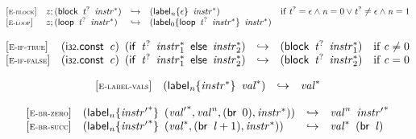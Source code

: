 \vspace{1ex}

$$
\begin{array}{@{}l@{}lcl@{}l@{}}
{[\textsc{\scriptsize E{-}block}]} \quad & {\mathit{z}} ; (\mathsf{block}~\,{{\mathit{t}}^?}~\,{{\mathit{instr}}^\ast}) &\hookrightarrow& ({{\mathsf{label}}_{{\mathit{n}}}}{\{\epsilon\}}~\,{{\mathit{instr}}^\ast}) &\quad
  \mbox{if}~{{\mathit{t}}^?} = \epsilon \land {\mathit{n}} = 0 \lor {{\mathit{t}}^?} \neq \epsilon \land {\mathit{n}} = 1 \\
{[\textsc{\scriptsize E{-}loop}]} \quad & {\mathit{z}} ; (\mathsf{loop}~\,{{\mathit{t}}^?}~\,{{\mathit{instr}}^\ast}) &\hookrightarrow& ({{\mathsf{label}}_{0}}{\{\mathsf{loop}~\,{{\mathit{t}}^?}~\,{{\mathit{instr}}^\ast}\}}~\,{{\mathit{instr}}^\ast}) &  \\
\end{array}
$$

$$
\begin{array}{@{}l@{}lcl@{}l@{}}
{[\textsc{\scriptsize E{-}if{-}true}]} \quad & (\mathsf{i{\scriptstyle32}}.\mathsf{const}~\,{\mathit{c}})~\,(\mathsf{if}~\,{{\mathit{t}}^?}~\,{{\mathit{instr}}_{{1}}^\ast}~\,\mathsf{else}~\,{{\mathit{instr}}_{{2}}^\ast}) &\hookrightarrow& (\mathsf{block}~\,{{\mathit{t}}^?}~\,{{\mathit{instr}}_{{1}}^\ast}) &\quad
  \mbox{if}~{\mathit{c}} \neq 0 \\
{[\textsc{\scriptsize E{-}if{-}false}]} \quad & (\mathsf{i{\scriptstyle32}}.\mathsf{const}~\,{\mathit{c}})~\,(\mathsf{if}~\,{{\mathit{t}}^?}~\,{{\mathit{instr}}_{{1}}^\ast}~\,\mathsf{else}~\,{{\mathit{instr}}_{{2}}^\ast}) &\hookrightarrow& (\mathsf{block}~\,{{\mathit{t}}^?}~\,{{\mathit{instr}}_{{2}}^\ast}) &\quad
  \mbox{if}~{\mathit{c}} = 0 \\
\end{array}
$$

\vspace{1ex}

$$
\begin{array}{@{}l@{}lcl@{}l@{}}
{[\textsc{\scriptsize E{-}label{-}vals}]} \quad & ({{\mathsf{label}}_{{\mathit{n}}}}{\{{{\mathit{instr}}^\ast}\}}~\,{{\mathit{val}}^\ast}) &\hookrightarrow& {{\mathit{val}}^\ast} &  \\
\end{array}
$$

\vspace{1ex}

$$
\begin{array}{@{}l@{}lcl@{}l@{}}
{[\textsc{\scriptsize E{-}br{-}zero}]} \quad & ({{\mathsf{label}}_{{\mathit{n}}}}{\{{{\mathit{instr}'}^\ast}\}}~\,({{\mathit{val}'}^\ast}, {{\mathit{val}}^{{\mathit{n}}}}, (\mathsf{br}~\,0), {{\mathit{instr}}^\ast})) &\hookrightarrow& {{\mathit{val}}^{{\mathit{n}}}}~\,{{\mathit{instr}'}^\ast} &  \\
{[\textsc{\scriptsize E{-}br{-}succ}]} \quad & ({{\mathsf{label}}_{{\mathit{n}}}}{\{{{\mathit{instr}'}^\ast}\}}~\,({{\mathit{val}}^\ast}, (\mathsf{br}~\,{\mathit{l}} + 1), {{\mathit{instr}}^\ast})) &\hookrightarrow& {{\mathit{val}}^\ast}~\,(\mathsf{br}~\,{\mathit{l}}) &  \\
\end{array}
$$

